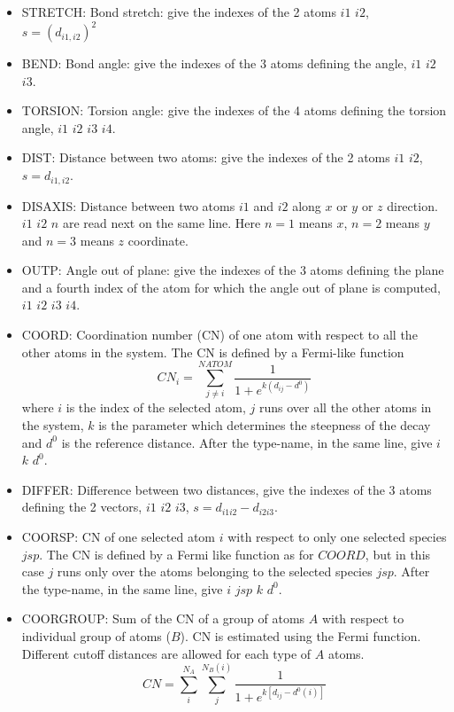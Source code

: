 \documentclass[twoside,10pt,titlepage,a4paper]{article}
\begin{document}
\begin{itemize}
\item{STRETCH:} Bond stretch: give the indexes of the 2 atoms  $i1$ $ i2$, $s = (d_{i1,i2})^{2}$
\item{BEND:} Bond angle: give the indexes of the 3 atoms defining the angle, $i1$ $ i2$ $i3$.
\item{TORSION:} Torsion angle: give the indexes of the 4 atoms
defining the torsion angle, $i1$ $ i2 $ $i3$ $ i4$.
\item{DIST:} Distance between two atoms: give the indexes of the 2 atoms $i1$ $ i2$, $s = d_{i1,i2}$.
\item{DISAXIS:} Distance between two atoms $i1$ and $i2$ along $x$ or $y$ or $z$ direction. $i1$ $i2$ $n$ are
read next on the same line. Here $n=1$ means $x$, $n=2$ means $y$ and $n=3$ means $z$ coordinate.
\item{OUTP:} Angle out of plane: give the indexes of the 3 atoms
defining the plane and a fourth index of the atom for which the
angle out of plane is computed, $i1$ $ i2 $ $i3$ $ i4$.
\item{COORD:} Coordination number (CN) of one atom with respect to all the
other atoms in the system. The CN is defined by a Fermi-like function
\begin{equation}
 CN_i = \sum_{j \neq i}^{NATOM}\frac{1}{1+e^{k(d_{ij}-d^0)}}
\end{equation}
where $i$ is the index of the selected atom, $j$ runs over all the other
atoms in the system, $k$ is the parameter which determines the steepness
of the decay and $d^0$ is the reference distance. After the type-name,
in the same line, give $i$ $k$ $d^0$.
\item{DIFFER:} Difference between two distances, give the indexes of the 3 atoms
defining the 2 vectors, $i1$ $ i2 $ $i3$, $s = d_{i1i2}-d_{i2i3}$.
\item{COORSP:} CN of one selected atom $i$ with respect to only one selected
species $jsp$. The CN is defined by a Fermi like function as for $COORD$,
but in this case $j$ runs only over the atoms belonging to the selected
species $jsp$. After the type-name, in the same line, give $i$ $jsp$ $k$ $d^0$.
\item{COORGROUP:} Sum of the CN of a group of atoms $A$ with respect to
individual group of atoms ($B$). CN is estimated using the Fermi function.
Different cutoff distances are allowed for each type of $A$ atoms.
\begin{equation}
 CN = \sum_{i}^{N_A}  \sum_{j}^{N_B(i)} \frac{1}{1+e^{k\left[d_{ij}-d^0(i)\right]}}

\end{equation}
\end{itemize}
\end{document}
